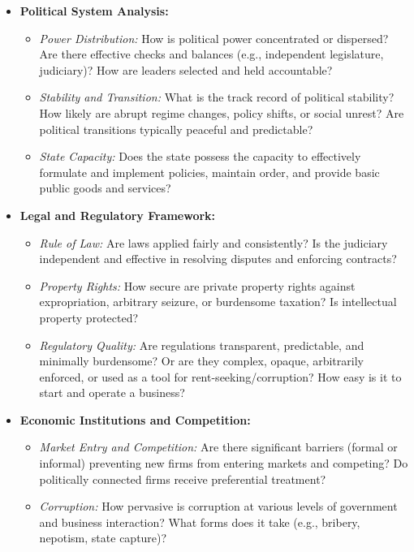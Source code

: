 \begin{itemize}
    \item \textbf{Political System Analysis:}
          \begin{itemize}
              \item \textit{Power Distribution:} How is political power concentrated or dispersed? Are there effective checks and balances (e.g., independent legislature, judiciary)? How are leaders selected and held accountable?
              \item \textit{Stability and Transition:} What is the track record of political stability? How likely are abrupt regime changes, policy shifts, or social unrest? Are political transitions typically peaceful and predictable?
              \item \textit{State Capacity:} Does the state possess the capacity to effectively formulate and implement policies, maintain order, and provide basic public goods and services?
          \end{itemize}
    \item \textbf{Legal and Regulatory Framework:}
          \begin{itemize}
              \item \textit{Rule of Law:} Are laws applied fairly and consistently? Is the judiciary independent and effective in resolving disputes and enforcing contracts?
              \item \textit{Property Rights:} How secure are private property rights against expropriation, arbitrary seizure, or burdensome taxation? Is intellectual property protected?
              \item \textit{Regulatory Quality:} Are regulations transparent, predictable, and minimally burdensome? Or are they complex, opaque, arbitrarily enforced, or used as a tool for rent-seeking/corruption? How easy is it to start and operate a business?
          \end{itemize}
    \item \textbf{Economic Institutions and Competition:}
          \begin{itemize}
              \item \textit{Market Entry and Competition:} Are there significant barriers (formal or informal) preventing new firms from entering markets and competing? Do politically connected firms receive preferential treatment?
              \item \textit{Corruption:} How pervasive is corruption at various levels of government and business interaction? What forms does it take (e.g., bribery, nepotism, state capture)?

\end{itemize}
\end{itemize}
